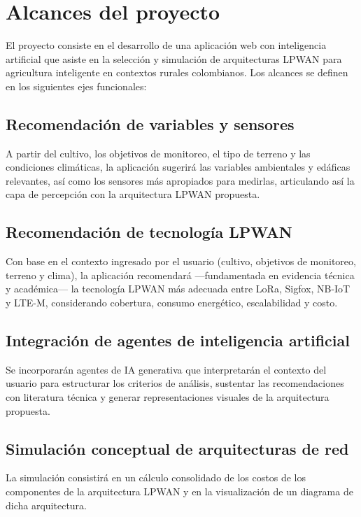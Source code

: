 \section{Alcances del proyecto} El proyecto consiste en  el  desarrollo  de  una
aplicación web  con  inteligencia  artificial  que  asiste  en  la  selección  y
simulación de arquitecturas LPWAN  para  agricultura  inteligente  en  contextos
rurales colombianos. Los alcances se definen en los siguientes ejes funcionales:


\subsection{Recomendación de variables y sensores} A  partir  del  cultivo,  los
objetivos de monitoreo, el tipo de terreno  y  las  condiciones  climáticas,  la
aplicación sugerirá las variables ambientales y edáficas  relevantes,  así  como
los sensores más apropiados para medirlas, articulando así la capa de percepción
con la arquitectura LPWAN propuesta.

\subsection{Recomendación de tecnología LPWAN} Con base en el contexto ingresado
por el usuario (cultivo, objetivos de monitoreo, terreno y clima), la aplicación
recomendará —fundamentada en evidencia técnica y académica— la tecnología  LPWAN
más adecuada entre LoRa, Sigfox, NB-IoT y LTE-M, considerando cobertura, consumo
energético, escalabilidad y costo.

\subsection{Integración de agentes de inteligencia artificial}  Se  incorporarán
agentes de  IA  generativa  que  interpretarán  el  contexto  del  usuario  para
estructurar  los  criterios  de  análisis,  sustentar  las  recomendaciones  con
literatura técnica  y  generar  representaciones  visuales  de  la  arquitectura
propuesta.

\subsection{Simulación  conceptual  de  arquitecturas  de  red}  La   simulación
consistirá en un cálculo consolidado de los costos  de  los  componentes  de  la
arquitectura LPWAN y en la visualización de un diagrama de dicha arquitectura.


